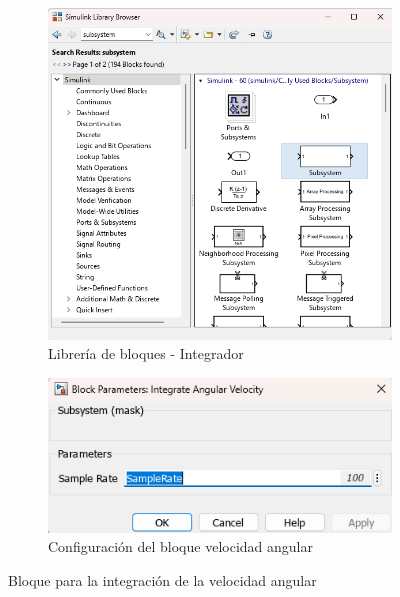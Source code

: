\begin{figure}[htbp]
    \centering
    \begin{subfigure}[b]{0.35\textwidth}
        \centering
        \includegraphics[width=\textwidth]{fig/Capitulo5/Caso_de_estudio_IMU/Generador_de_archivos/libreria_de_bloques_subsistema_integracion_velocidad_angular.png}
        \caption{Librería de bloques - Integrador}
        \label{fig:lib_bloques_integrador}
    \end{subfigure}
    \hfill
    \begin{subfigure}[b]{0.45\textwidth}
        \centering
        \includegraphics[width=\textwidth]{fig/Capitulo5/Caso_de_estudio_IMU/Generador_de_archivos/configuracion_integrador_velocidad_angular.png}
        \caption{Configuración del bloque velocidad angular}
        \label{fig:config_bloques_integrador}
    \end{subfigure}
    \caption{Bloque para la integración de la velocidad angular}
    \label{fig:integration_for_angular_velocity}
\end{figure}

